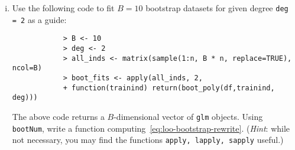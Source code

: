 \documentclass{article}
\begin{document}
\begin{enumerate}
\begin{enumerate}[(i)]
\begin{Verbatim}[frame=single]
\end{Verbatim}


		\item Use the following code to fit $B = 10$ bootstrap datasets for
		given degree \texttt{deg = 2} as a guide:
		\begin{verbatim}
			> B <- 10
			> deg <- 2
			> all_inds <- matrix(sample(1:n, B * n, replace=TRUE), ncol=B)
			> boot_fits <- apply(all_inds, 2,
			+ function(trainind) return(boot_poly(df,trainind, deg)))

		\end{verbatim}
		The above code returns a $B$-dimensional vector of \texttt{glm} objects.
		Using \texttt{bootNum}, write a function
		computing~\eqref{eq:loo-bootstrap-rewrite}.
		(\textit{Hint}: while not necessary, you may find the functions
		\texttt{apply, lapply, sapply} useful.)
		\begin{Verbatim}[frame=single]












		\end{Verbatim}

	\end{enumerate}
\end{enumerate}
\end{document}
